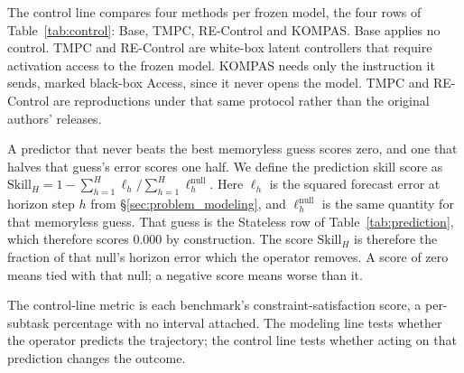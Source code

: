 The control line compares four methods per frozen model, the four rows of Table~\ref{tab:control}: Base, TMPC, RE-Control and KOMPAS.  %
Base applies no control.  %
TMPC and RE-Control are white-box latent controllers that require activation access to the frozen model.  %
KOMPAS needs only the instruction it sends, marked black-box Access, since it never opens the model.  %
TMPC and RE-Control are reproductions under that same protocol rather than the original authors' releases.  %

A predictor that never beats the best memoryless guess scores zero, and one that halves that guess's error scores one half.
We define the prediction skill score as \(\mathrm{Skill}_H = 1-\sum_{h=1}^{H}\ell_h\big/\sum_{h=1}^{H}\ell_h^{\mathrm{null}}\). Here \(\ell_h\) is the squared forecast error at horizon step \(h\) from \S\ref{sec:problem_modeling}, and \(\ell_h^{\mathrm{null}}\) is the same quantity for that memoryless guess.  %
That guess is the Stateless row of Table~\ref{tab:prediction}, which therefore scores 0.000 by construction.
The score $\mathrm{Skill}_H$ is therefore the fraction of that null's horizon error which the operator removes.  %
A score of zero means tied with that null; a negative score means worse than it.

The control-line metric is each benchmark's constraint-satisfaction score, a per-subtask percentage with no interval attached.  %
The modeling line tests whether the operator predicts the trajectory; the control line tests whether acting on that prediction changes the outcome.  %
